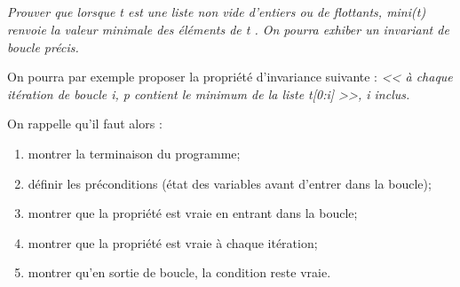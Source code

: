 \documentclass[10pt]{article}
\newif\ifprof
\begin{document}
\subparagraph{}
\textit{Prouver que lorsque \textsf{t} est une liste non vide d’entiers ou de flottants, \textsf{mini(t)} renvoie la valeur
minimale des éléments de \textsf{t} . On pourra exhiber un invariant de boucle précis.}

\begin{rem}
On pourra par exemple proposer la propriété d'invariance suivante : \textit{<< à chaque itération de boucle \textsf{i}, \textsf{p} contient le minimum de la liste \textsf{t[0:i]} >>, \textsf{i} inclus.}

On rappelle qu'il faut alors  :
\begin{enumerate}
\item montrer la terminaison du programme;
\item définir les préconditions (état des variables avant d’entrer dans la boucle);
\item montrer que la propriété est vraie en entrant dans la boucle;
\item montrer que la propriété est vraie à chaque itération;
\item montrer qu’en sortie de boucle, la condition reste vraie.
\end{enumerate}
\end{rem}
\ifprof
\begin{corrige}
Invariant de boucle proposé : à chaque itération de boucle \textsf{i}, \textsf{p} contient le minimum de la liste \textsf{t[0:i]}, \textsf{i} inclus.

\begin{enumerate}
\item L'algorithme faisant appel à une boucle for dans laquelle la taille de \textsf{t} ne varie jamais et dans laquelle \textsf{i} est incrémentée à chaque itération, la boucle se terminera après \textsf{len(t)} itérations.
\item Avant d'entrer dans la boucle, \textsf{p=t[0]}.
\item À la première itération, en entrant dans la boucle, \textsf{p=t[0]}. \textsf{p} est bien la valeur minimale de la portion de tableau de 1 élément.
\item À la ième itération, on considère que \textsf{p} est le minimum de la liste \textsf{t[0:i]}. À l'itération \textsf{i+1}, si \textsf{p} est inférieur à \textsf{t[i+1]} alors la \textsf{p} prend la valeur de \textsf{t[i+1]}. \textsf{p} est donc la valeur minimale de la liste \textsf{t[i+1]}.
\item À l'itération \textsf{len(t)}, \textsf{p} est donc la valeur minimale de \textsf{t}.

\end{enumerate}
\end{corrige}
\else
\fi
\end{document}
